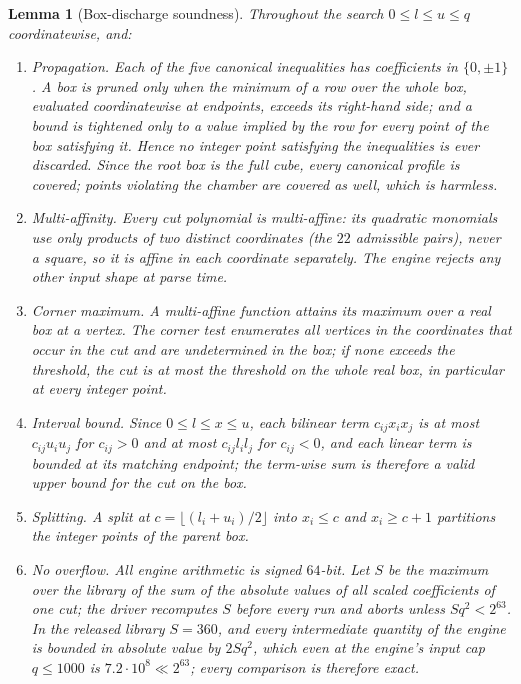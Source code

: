 \documentclass[11pt]{amsart}
\newtheorem{lemma}[theorem]{Lemma}
\theoremstyle{definition}
\theoremstyle{remark}
\begin{document}
\begin{lemma}[Box-discharge soundness]\label{lem:boxops}
Throughout the search $0\le l\le u\le q$ coordinatewise, and:
\begin{enumerate}
\item[(i)] \emph{Propagation.}  Each of the five canonical inequalities has
coefficients in $\{0,\pm1\}$.  A box is pruned only when the minimum of a
row over the whole box, evaluated coordinatewise at endpoints, exceeds its
right-hand side; and a bound is tightened only to a value implied by the row
for every point of the box satisfying it.  Hence no integer point satisfying
the inequalities is ever discarded.  Since the root box is the full cube,
every canonical profile is covered; points violating the chamber are covered
as well, which is harmless.
\item[(ii)] \emph{Multi-affinity.}  Every cut polynomial is multi-affine:
its quadratic monomials use only products of two distinct coordinates
(the $22$ admissible pairs), never a square, so it is affine in each
coordinate separately.  The engine rejects any other input shape at parse
time.
\item[(iii)] \emph{Corner maximum.}  A multi-affine function attains its
maximum over a real box at a vertex.  The corner test enumerates all
vertices in the coordinates that occur in the cut and are undetermined in
the box; if none exceeds the threshold, the cut is at most the threshold on
the whole real box, in particular at every integer point.
\item[(iv)] \emph{Interval bound.}  Since $0\le l\le x\le u$, each bilinear
term $c_{ij}x_ix_j$ is at most $c_{ij}u_iu_j$ for $c_{ij}>0$ and at most
$c_{ij}l_il_j$ for $c_{ij}<0$, and each linear term is bounded at its
matching endpoint; the term-wise sum is therefore a valid upper bound for
the cut on the box.
\item[(v)] \emph{Splitting.}  A split at $c=\lfloor(l_i+u_i)/2\rfloor$ into
$x_i\le c$ and $x_i\ge c+1$ partitions the integer points of the parent box.
\item[(vi)] \emph{No overflow.}  All engine arithmetic is signed $64$-bit.
Let $S$ be the maximum over the library of the sum of the absolute values of
all scaled coefficients of one cut; the driver recomputes $S$ before every
run and aborts unless $Sq^2<2^{63}$.  In the released library $S=360$, and
every intermediate quantity of the engine is bounded in absolute value by
$2Sq^2$, which even at the engine's input cap $q\le1000$ is
$7.2\cdot10^{8}\ll2^{63}$; every comparison is therefore exact.
\end{enumerate}
\end{lemma}
\end{document}
